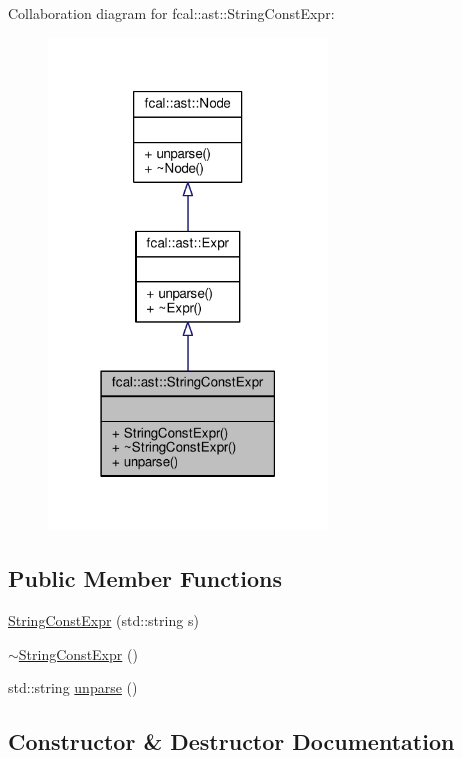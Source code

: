 Collaboration diagram for fcal\+:\+:ast\+:\+:String\+Const\+Expr\+:
\nopagebreak
\begin{figure}[H]
\begin{center}
\leavevmode
\includegraphics[width=210pt]{classfcal_1_1ast_1_1StringConstExpr__coll__graph}
\end{center}
\end{figure}
\subsection*{Public Member Functions}
\begin{DoxyCompactItemize}
\item 
\hyperlink{classfcal_1_1ast_1_1StringConstExpr_a030c95f7961c9ed65db1c67118feffd6}{String\+Const\+Expr} (std\+::string s)
\item 
\hyperlink{classfcal_1_1ast_1_1StringConstExpr_a32c12b772f66f0ee32c9b4ddf9039104}{$\sim$\+String\+Const\+Expr} ()
\item 
std\+::string \hyperlink{classfcal_1_1ast_1_1StringConstExpr_a31ebd91190d48077a842cd711c5b0f26}{unparse} ()
\end{DoxyCompactItemize}


\subsection{Constructor \& Destructor Documentation}
